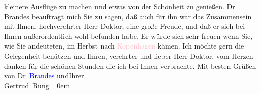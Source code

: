                     kleinere Ausflüge zu machen und etwas von der Schönheit zu genießen.\pend
           \pstart
           Dr Brandes beauftragt mich Sie {\pb}zu sagen, daß auch für ihn war das Zusammensein mit Ihnen, hochverehrter Herr
                    Doktor, eine große Freude, und daß er sich bei Ihnen außerordentlich wohl
                    befunden habe. Er würde sich sehr freuen wenn Sie, wie Sie andeuteten, im Herbst
                    nach \textcolor{pink}{Kopenhagen}{}\ledrightnote{\textcolor{pink}{Kopenhagen}} kämen.\pend
           \pstart
           Ich möchte gern die Gelegenheit benützen und Ihnen, verehrter und lieber Herr
                    Doktor, vom Herzen danken für die schönen Stunden die ich bei Ihnen
                    verbrachte.\pend
           \pstart
           Mit besten Grüßen von Dr \textcolor{blue}{Brandes}{}\ledrightnote{\textcolor{blue}{Georg Brandes}}
                        und\hspace*{2.5em}Ihrer{\\[\baselineskip]}\spacefill\mbox{Gertrud Rung}\pend
           \leftskip=0em{}\endnumbering{}  
      